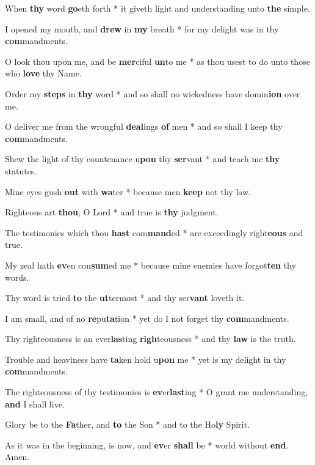 \begin{multicols}{2}
	When \textbf{thy} word \textbf{go}eth forth * it giveth light and understanding unto \textbf{the} simple.
	
	I opened my mouth, and \textbf{drew} in \textbf{my} breath * for my delight was in thy \textbf{com}mandments.
	
	O look thou upon me, and be \textbf{mer}ciful \textbf{un}to me * as thou usest to do unto those who \textbf{love} thy Name.
	
	Order my \textbf{steps} in \textbf{thy} word * and so shall no wickedness have domin\textbf{ion} over me.
	
	O deliver me from the wrongful \textbf{deal}ings \textbf{of} men * and so shall I keep thy \textbf{com}mandments.
	
	Shew the light of thy countenance u\textbf{pon} thy \textbf{ser}vant * and teach me \textbf{thy} statutes.
	
	Mine eyes gush \textbf{out} with \textbf{wa}ter * because men \textbf{keep} not thy law.
	
	Righteous art \textbf{thou}, O Lord * and true is \textbf{thy} judgment.
	
	The testimonies which thou \textbf{hast} com\textbf{mand}ed * are exceedingly right\textbf{eous} and true.
	
	My zeal hath \textbf{ev}en con\textbf{sum}ed me * because mine enemies have forgot\textbf{ten} thy words.
	
	Thy word is tried \textbf{to} the \textbf{ut}termost * and thy ser\textbf{vant} loveth it.
	
	I am small, and of no \textbf{re}pu\textbf{ta}tion * yet do I not forget thy \textbf{com}mandments.
	
	Thy righteousness is an ever\textbf{las}ting \textbf{righ}teousness * and thy \textbf{law} is the truth.
	
	Trouble and heaviness have \textbf{ta}ken hold u\textbf{pon} me * yet is my delight in thy \textbf{com}mandments.
	
	The righteousness of thy testimonies is \textbf{ev}er\textbf{last}ing * O grant me understanding, \textbf{and} I shall live.
	
	Glory be to the \textbf{Fa}ther, and \textbf{to} the Son * and to the Ho\textbf{ly} Spirit.
	
	As it was in the beginning, is now, and \textbf{ev}er \textbf{shall} be * world without \textbf{end}. Amen.
\end{multicols}